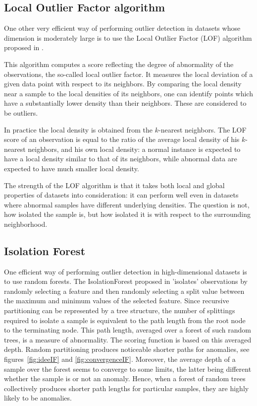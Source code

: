\subsection{Local Outlier Factor algorithm}
\label{sec:lof}
One other very efficient way of performing outlier detection in datasets whose dimension is moderately large is to use the Local Outlier Factor (LOF) algorithm proposed in \cite{Breunig2000LOF}.

This algorithm computes a score reflecting the degree of abnormality of the observations, the so-called local outlier factor. It measures the local deviation of a given data point with respect to its neighbors. By comparing the local density near a sample to the local densities of its neighbors, one can identify points which have a substantially lower density than their neighbors. These are considered to be outliers.

In practice the local density is obtained from the $k$-nearest neighbors. The LOF score of an observation is equal to the ratio of the average local density of his $k$-nearest neighbors, and his own local density: a normal instance is expected to have a local density similar to that of its neighbors, while abnormal data are expected to have much smaller local density.

The strength of the LOF algorithm is that it takes both local and global properties of datasets into consideration: it can perform well even in datasets where abnormal samples have different underlying densities. The question is not, how isolated the sample is, but how isolated it is with respect to the surrounding neighborhood.


\subsection{Isolation Forest}
\label{sec:iforest}


One efficient way of performing outlier detection in high-dimensional datasets
is to use random forests.
%
The IsolationForest proposed in \cite{Liu2008} 'isolates' observations by randomly selecting a feature and then randomly selecting a split value between the maximum and minimum values of the selected feature.
%
Since recursive partitioning can be represented by a tree structure, the
number of splittings required to isolate a sample is equivalent to the path
length from the root node to the terminating node.
%
This path length, averaged over a forest of such random trees, is a measure
of abnormality. The scoring function is based on this averaged depth.
%
Random partitioning produces noticeable shorter paths for anomalies, see figures~\ref{fig:ideeIF} and \ref{fig:convergenceIF}. Moreover, the average depth of a sample over the forest seems to converge to some limits, the latter being different whether the sample is or not an anomaly.
Hence, when a forest of random trees collectively produces shorter path lengths
for particular samples, they are highly likely to be anomalies.
%




